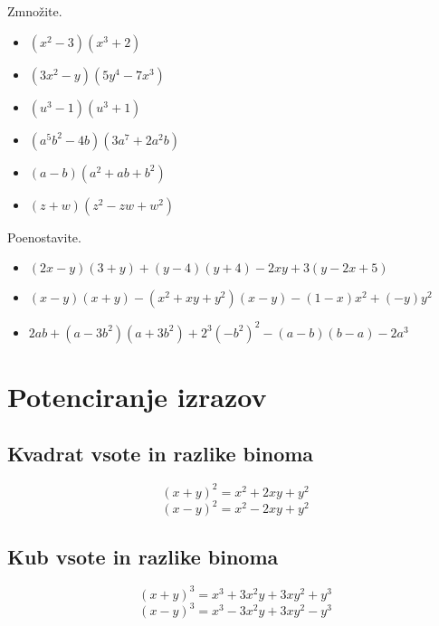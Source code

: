     
        
            \begin{naloga}
                Zmnožite.
                \begin{itemize}
                    \item $(x^2-3)(x^3+2)$ 
                    \item $(3x^2-y)(5y^4-7x^3)$ 
                    \item $(u^3-1)(u^3+1)$ 
                    \item $(a^5b^2-4b)(3a^7+2a^2b)$ 
                    \item $(a-b)(a^2+ab+b^2)$ 
                    \item $(z+w)(z^2-zw+w^2)$ 
                \end{itemize}
            \end{naloga}
        
    
        
            \begin{naloga}
                Poenostavite.
                \begin{itemize}
                    \item $(2x-y)(3+y)+(y-4)(y+4)-2xy+3(y-2x+5)$ 
                    \item $(x-y)(x+y)-(x^2+xy+y^2)(x-y)-(1-x)x^2+(-y)y^2$ 
                    \item $2ab+(a-3b^2)(a+3b^2)+2^3(-b^2)^2-(a-b)(b-a)-2a^3$  
                \end{itemize}
            \end{naloga}
        

\newpage
\section{Potenciranje izrazov}

            
                \subsection*{Kvadrat vsote in razlike binoma}
                    $$ (x+y)^2=x^2+2xy+y^2 $$
                    $$ (x-y)^2=x^2-2xy+y^2 $$
                
        
                \subsection*{Kub vsote in razlike binoma}
                    $$ (x+y)^3=x^3+3x^2y+3xy^2+y^3 $$
                    $$ (x-y)^3=x^3-3x^2y+3xy^2-y^3 $$
                
